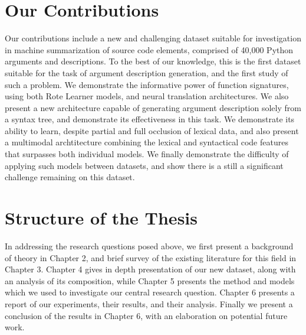 \section{Our Contributions}

Our contributions include a new and challenging dataset suitable for investigation in machine summarization of source code elements, comprised of 40,000 Python arguments and descriptions.
To the best of our knowledge, this is the first dataset suitable for the task of argument description generation, and the first study of such a problem.
We demonstrate the informative power of function signatures, using both Rote Learner models, and neural translation architectures.
We also present a new architecture capable of generating argument description solely from a syntax tree, and demonstrate its effectiveness in this task.
We demonstrate its ability to learn, despite partial and full occlusion of lexical data, and also present a multimodal archtitecture combining the lexical and syntactical code features that surpasses both individual models.
We finally demonstrate the difficulty of applying such models between datasets, and show there is a still a significant challenge remaining on this dataset.


\section{Structure of the Thesis} %
\label{sec:structure_of_the_thesis}

In addressing the research questions posed above, we first present a background of theory in Chapter 2, and brief survey of the existing literature for this field in Chapter 3.
Chapter 4 gives in depth presentation of our new dataset, along with an analysis of its composition, while Chapter 5 presents the method and models which we used to investigate our central research question. 
Chapter 6 presents a report of our experiments, their results, and their analysis.
Finally we present a conclusion of the results in Chapter 6, with an elaboration on potential future work.








